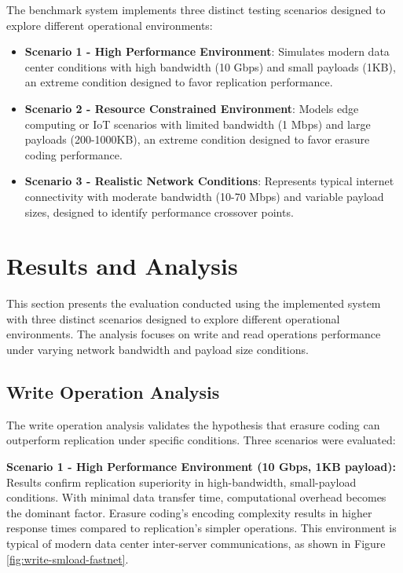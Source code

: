The benchmark system implements three distinct testing scenarios designed to explore different operational environments:

\begin{itemize}
\item \textbf{Scenario 1 - High Performance Environment}: Simulates modern data center conditions with high bandwidth (10 Gbps) and small payloads (1KB), an extreme condition designed to favor replication performance.
\item \textbf{Scenario 2 - Resource Constrained Environment}: Models edge computing or IoT scenarios with limited bandwidth (1 Mbps) and large payloads (200-1000KB), an extreme condition designed to favor erasure coding performance.
\item \textbf{Scenario 3 - Realistic Network Conditions}: Represents typical internet connectivity with moderate bandwidth (10-70 Mbps) and variable payload sizes, designed to identify performance crossover points.
\end{itemize}

\section{Results and Analysis}

This section presents the evaluation conducted using the implemented system with three distinct scenarios designed to explore different operational environments. The analysis focuses on write and read operations performance under varying network bandwidth and payload size conditions.

\subsection{Write Operation Analysis}

The write operation analysis validates the hypothesis that erasure coding can outperform replication under specific conditions. Three scenarios were evaluated:

\textbf{Scenario 1 - High Performance Environment (10 Gbps, 1KB payload):} Results confirm replication superiority in high-bandwidth, small-payload conditions. With minimal data transfer time, computational overhead becomes the dominant factor. Erasure coding's encoding complexity results in higher response times compared to replication's simpler operations. This environment is typical of modern data center inter-server communications, as shown in Figure \ref{fig:write-smload-fastnet}.

